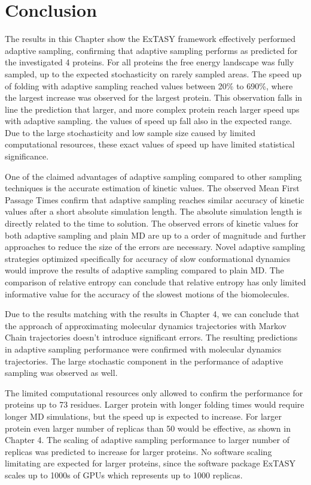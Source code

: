 \section{\label{sec:conclusion}Conclusion}

The results in this Chapter show the ExTASY framework \cite{Extasy2019} effectively
performed adaptive sampling, confirming that adaptive sampling performs as predicted for the investigated 4 proteins. 
For all proteins the free energy landscape was fully sampled, up to the expected stochasticity on rarely sampled areas. The speed up of folding with adaptive sampling reached values between 20\% to 690\%, where the largest increase was observed for the largest protein. This observation falls in line the prediction that larger, and more complex protein reach larger speed ups with adaptive sampling. the values of speed up fall also in the expected range. Due to the large stochasticity and low sample size caused by limited computational resources, these exact values of speed up have limited statistical significance. 

One of the claimed advantages of adaptive sampling compared to other sampling techniques is the accurate estimation of kinetic values. The observed Mean First Passage Times confirm that adaptive sampling reaches similar accuracy of kinetic values after a short absolute simulation length. The absolute simulation length is directly related to the time to solution. The observed errors of kinetic values for both adaptive sampling and plain MD are up to a order of magnitude and further approaches to reduce the size of the errors are necessary. Novel adaptive sampling strategies optimized specifically for accuracy of slow conformational dynamics would improve the results of adaptive sampling compared to plain MD. The comparison of relative entropy can conclude that relative entropy has only limited informative value for the accuracy of the slowest motions of the biomolecules.  
 

Due to the results matching with the results in Chapter 4, we can conclude that the approach of approximating molecular dynamics trajectories with Markov Chain trajectories doesn't introduce significant errors. The resulting predictions in adaptive sampling performance were confirmed with molecular dynamics trajectories. The large stochastic component in the performance of adaptive sampling was observed as well.


The limited computational resources only allowed to confirm the performance for proteins up to 73 residues. Larger protein with longer folding times would require longer MD simulations, but the speed up is expected to increase. For larger protein even larger number of replicas than 50 would be effective, as shown in Chapter 4. The scaling of adaptive sampling performance to larger number of replicas was predicted to increase for larger proteins. No software scaling limitating are expected for larger proteins, since the software package ExTASY scales up to 1000s of GPUs which represents up to 1000 replicas.